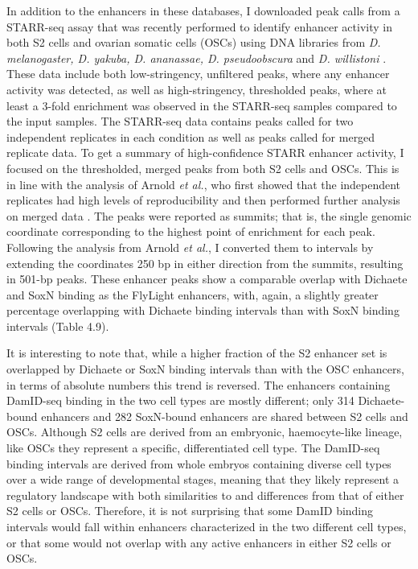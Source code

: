 In addition to the enhancers in these databases, I downloaded peak calls from a STARR-seq assay that was recently performed to identify enhancer activity in both S2 cells and ovarian somatic cells (OSCs) using DNA libraries from \emph{D. melanogaster, D. yakuba, D. ananassae, D. pseudoobscura} and \emph{D. willistoni} \citep{arnold_quantitative_2014}. These data include both low-stringency, unfiltered peaks, where any enhancer activity was detected, as well as high-stringency, thresholded peaks, where at least a 3-fold enrichment was observed in the STARR-seq samples compared to the input samples. The STARR-seq data contains peaks called for two independent replicates in each condition as well as peaks called for merged replicate data. To get a summary of high-confidence STARR enhancer activity, I focused on the thresholded, merged peaks from both S2 cells and OSCs. This is in line with the analysis of Arnold \emph{et al.}, who first showed that the independent replicates had high levels of reproducibility and then performed further analysis on merged data \citep{arnold_quantitative_2014}. The peaks were reported as summits; that is, the single genomic coordinate corresponding to the highest point of enrichment for each peak. Following the analysis from Arnold \emph{et al.}, I converted them to intervals by extending the coordinates 250 bp in either direction from the summits, resulting in 501-bp peaks. These enhancer peaks show a comparable overlap with Dichaete and SoxN binding as the FlyLight enhancers, with, again, a slightly greater percentage overlapping with Dichaete binding intervals than with SoxN binding intervals (Table 4.9).

It is interesting to note that, while a higher fraction of the S2 enhancer set is overlapped by Dichaete or SoxN binding intervals than with the OSC enhancers, in terms of absolute numbers this trend is reversed. The enhancers containing DamID-seq binding in the two cell types are mostly different; only 314 Dichaete-bound enhancers and 282 SoxN-bound enhancers are shared between S2 cells and OSCs. Although S2 cells are derived from an embryonic, haemocyte-like lineage, like OSCs they represent a specific, differentiated cell type. The DamID-seq binding intervals are derived from whole embryos containing diverse cell types over a wide range of developmental stages, meaning that they likely represent a regulatory landscape with both similarities to and differences from that of either S2 cells or OSCs. Therefore, it is not surprising that some DamID binding intervals would fall within enhancers characterized in the two different cell types, or that some would not overlap with any active enhancers in either S2 cells or OSCs.

